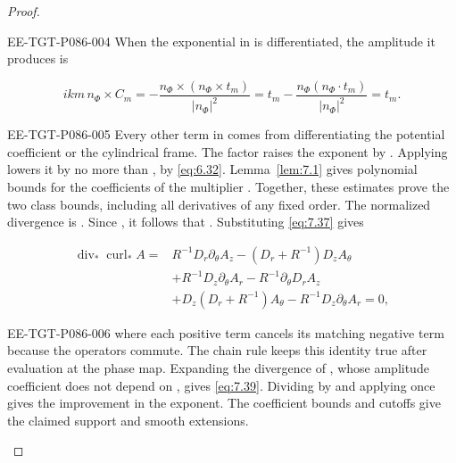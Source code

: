 \begin{proof}
\begin{EESegment}{EE-TGT-P086-004}
When the exponential in  is differentiated, the
amplitude it produces is
\end{EESegment}
\[
  ikm\,n_\Phi\times C_m
  =-\frac{n_\Phi\times(n_\Phi\times t_m)}{|n_\Phi|^2}
  =t_m-\frac{n_\Phi(n_\Phi\cdot t_m)}{|n_\Phi|^2}
  =t_m.
\]
\begin{EESegment}{EE-TGT-P086-005}
Every other term in  comes from differentiating the
potential coefficient  or the cylindrical frame. The factor
 raises the  exponent by
. Applying  lowers it by no more than
, by \eqref{eq:6.32}. Lemma~\ref{lem:7.1} gives polynomial bounds
for the coefficients of the multiplier . Together, these
estimates prove the two class bounds, including all derivatives of any fixed order. The normalized
divergence is
.
Since , it follows that
. Substituting \eqref{eq:7.37} gives
\end{EESegment}
\begin{align*}
  \operatorname{div}_*\operatorname{curl}_*A
   ={}&R^{-1}D_r\partial_\theta A_z-(D_r+R^{-1})D_zA_\theta\\
     &+R^{-1}D_z\partial_\theta A_r-R^{-1}\partial_\theta D_rA_z\\
     &+D_z(D_r+R^{-1})A_\theta-R^{-1}D_z\partial_\theta A_r=0,
\end{align*}
\begin{EESegment}{EE-TGT-P086-006}
where each positive term cancels its matching negative term because the operators commute. The
chain rule keeps this identity true after evaluation at the phase map. Expanding the divergence of
, whose amplitude coefficient does not depend on
, gives \eqref{eq:7.39}. Dividing by
 and applying  once gives the improvement
 in the exponent. The coefficient bounds and cutoffs give the
claimed support and smooth extensions.
\end{EESegment}
\end{proof}


